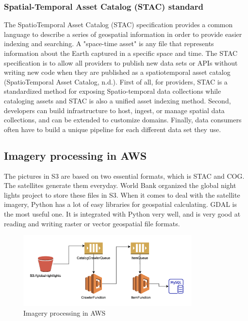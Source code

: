 \documentclass[conference]{IEEEtran}
\begin{document}
\subsubsection{Spatial-Temporal Asset Catalog (STAC) standard}

The SpatioTemporal Asset Catalog (STAC) specification provides a common language to describe a series of geospatial 
information in order to provide easier indexing and searching. A "space-time asset" is any file that represents information 
about the Earth captured in a specific space and time. The STAC specification is to allow all providers to publish new data 
sets or APIs without writing new code when they are published as a spatiotemporal asset catalog (SpatioTemporal Asset Catalog, n.d.). 
First of all, for providers, STAC is a standardized method for exposing Spatio-temporal data collections while cataloging 
assets and STAC is also a unified asset indexing method. Second, developers can build infrastructure to host, ingest, or 
manage spatial data collections, and can be extended to customize domains. Finally, data consumers often have to build a 
unique pipeline for each different data set they use.


\subsection{Imagery processing in AWS}

The pictures in S3 are based on two essential formats, which is STAC and COG. The satellites generate them everyday. 
World Bank organized the global night lights project to store these files in S3. When it comes to deal with the satellite 
imagery, Python has a lot of easy libraries for geospatial calculating. GDAL is the most useful one. 
It is integrated with Python very well, and is very good at reading and writing raster or vector geospatial file formats.


\begin{figure}[htbp]
    \centerline{\includegraphics[width=260pt]{images/dataprocess.png}}
    \caption{Imagery processing in AWS}
    \label{fig4}
\end{figure}
\end{document}
